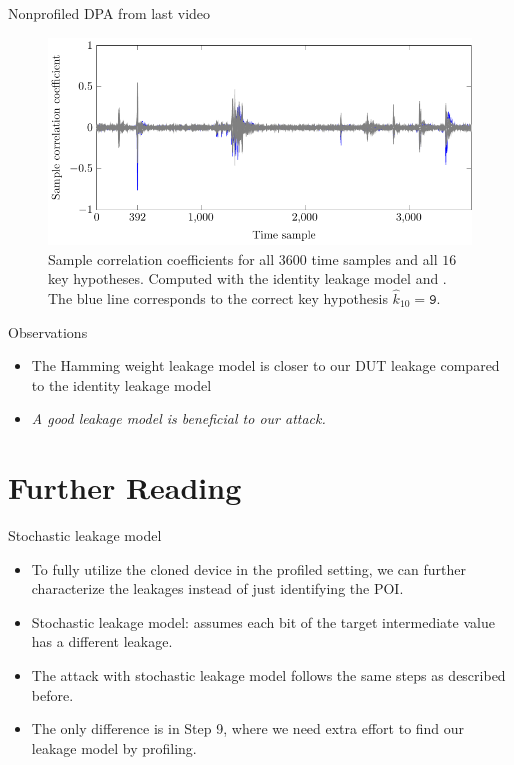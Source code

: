 \begin{frame}{Nonprofiled DPA from last video}
    \begin{figure}[h]
    \centering
    \includegraphics{fig/correlation_coefficients.pdf}
    \caption{Sample correlation coefficients for all $3600$ time samples and all $16$ key hypotheses.
    Computed with the identity leakage model and \dataranone.
    The blue line corresponds to the correct key hypothesis $\hat{k}_{10}=\texttt{9}$.}
\end{figure}
\end{frame}

\begin{frame}{Observations}
    \begin{itemize}
        \item The Hamming weight leakage model is closer to our DUT leakage compared to the identity leakage model
        \item \textit{A good leakage model is beneficial to our attack.}
    \end{itemize}
\end{frame}


\section{Further Reading}
\begin{frame}{\VideoName}
    \tableofcontents[currentsection]
\end{frame}

\begin{frame}{Stochastic leakage model}
    \begin{itemize}
        \item To fully utilize the cloned device in the profiled setting, we can further characterize the leakages instead of just identifying the POI.
        \item Stochastic leakage model: assumes each bit of the target intermediate value has a different leakage.
        \item The attack with stochastic leakage model follows the same steps as described before.
        \item The only difference is in Step 9, where we need extra effort to find our leakage model by profiling.
    \end{itemize}
\end{frame}


